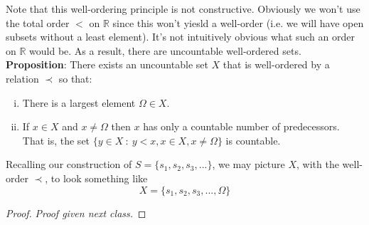 \documentclass[12pt]{article}
\newlength\tindent
\renewcommand{\indent}{\hspace*{\tindent}}
\newcommand{\R}{\mathbb R}
\begin{document}
\indent Note that this well-ordering principle is not constructive. Obviously we won't use the total order $<$ on $\R$ since this won't yiesld a well-order (i.e. we will have open subsets without a least element). It's not intuitively obvious what such an order on $\R$ would be. As a result, there are uncountable well-ordered sets. \\

{\bf Proposition}: There exists an uncountable set $X$ that is well-ordered by a relation $\prec$ so that:
\begin{enumerate}[(i)]
	\item There is a largest element $\Omega \in X$.
	\item If $x \in X$ and $x \neq \Omega$ then $x$ has only a countable number of predecessors. That is, the set $\{y \in X ~:~ y < x, x \in X, x \neq \Omega\}$ is countable.
\end{enumerate}

\indent Recalling our construction of $S = \{s_1, s_2, s_3, ...\}$, we may picture $X$, with the well-order $\prec$, to look something like
\begin{equation*}
	X = \{ s_1, s_2, s_3, ..., \Omega\}
\end{equation*}

\begin{proof} {\em Proof given next class.}
\end{proof}
\end{document}
